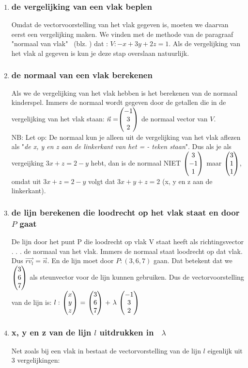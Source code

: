 \begin{enumerate}[label=(\alph*)]
\item \subsubsection{de vergelijking van een vlak beplen}
Omdat de vectorvoorstelling van het vlak gegeven is, moeten we daarvan eerst een vergelijking maken.
We vinden met de methode van de paragraaf "normaal van vlak" \ 
(blz. \pageref{vlaknormaal}) dat : $ V: -x + 3y +2z = 1 $.  Als de vergelijking van het vlak al gegeven is kun je deze stap overslaan natuurlijk. 
\item \subsubsection{de normaal van een vlak berekenen}
Als we de vergelijking van het vlak hebben is het berekenen van de normaal kinderspel. Immers de normaal wordt gegeven door de getallen die in de vergelijking van het vlak staan:
$ \vec{n} = \vecdrie{-1}{3}{2}  $ de normaal vector van $ V $.\\
NB: Let op: De normaal kun je alleen uit de vergelijking van het vlak aflezen als "\textit{de x, y en z aan de linkerkant van het = - teken staan}".  Dus als je als vergeijking $ 3x + z = 2 -y $ hebt, dan is de normaal NIET $  \vecdrie{3}{-1}{1}  $ maar  $ \vecdrie{3}{1}{1}  $, omdat uit $ 3x + z = 2 -y $ volgt dat $ 3x + y + z = 2 $ (x, y en z aan de linkerkant).
\item \subsubsection{de lijn berekenen die  loodrecht op het vlak staat  en door $ P $ gaat}
De lijn door het punt P die loodrecht op vlak V staat heeft als richtingsvector . . .  de normaal van het vlak. Immers de normaal staat loodrecht op dat vlak. Dus $ \overrightarrow{rv_{l}}  = \vec{n} $. En de lijn moet door $ P: (3,6,7)  $  gaan. Dat  betekent dat we $ \vecdrie{3}{6}{7} $ als steunvector voor de lijn kunnen gebruiken. Dus de vectorvoorstelling van de lijn is: $ l: \ \vecdrie{x}{y}{z} \ = \ \vecdrie{3}{6}{7} \ + \ \lambda \ \vecdrie{-1}{3}{2} \ $
\item \subsubsection{x, y en z van de lijn $  l $  uitdrukken in \ $  \lambda $}
Net zoals bij een vlak in \RD bestaat de vectorvorstelling van de lijn $ l  $ eigenlijk uit 3 vergelijkingen:

\end{enumerate}
